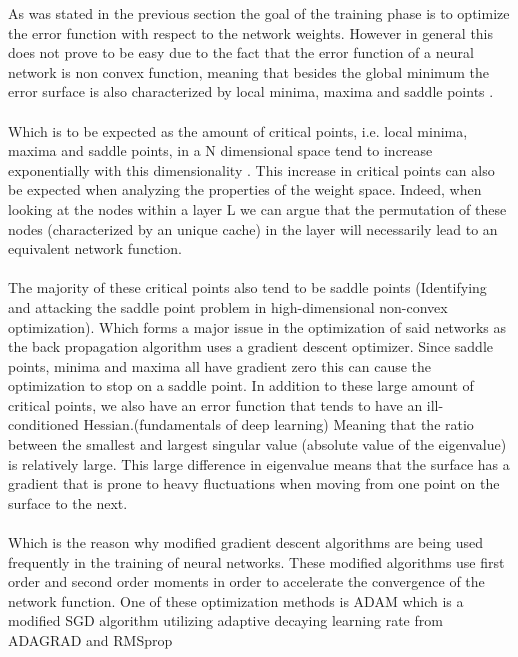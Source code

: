 \documentclass[12pt]{article}
\begin{document}
As was stated in the previous section the goal of the training phase is to optimize the error function with respect to the network weights. However in general this does not prove to be easy due to the fact that the error function of a neural network is non convex function, meaning that besides the global minimum the error surface is also characterized by local minima, maxima and saddle points \cite{Dauphin2014}.
\\
\\
Which is to be expected as the amount of critical points, i.e. local minima, maxima and saddle points, in a N dimensional space tend to increase exponentially with this dimensionality \cite{Dauphin2014}. This increase in critical points can also be expected when analyzing the properties of the weight space. Indeed, when looking at the nodes within a layer L we can argue that the permutation of these nodes (characterized by an unique cache) in the layer will necessarily lead to an equivalent network function.\cite{Bishop2013, Badrinarayanan2015} 
\\
\\
The majority of these critical points also tend to be saddle points (Identifying and attacking the saddle point problem in high-dimensional non-convex optimization). Which forms a major issue in the optimization of said networks as the back propagation algorithm uses a gradient descent optimizer. Since saddle points, minima and maxima all have gradient zero this can cause the optimization to stop on a saddle point. In addition to these large amount of critical points, we also have an error function that tends to have an ill-conditioned Hessian.(fundamentals of deep learning) Meaning that the ratio between the smallest and largest singular value (absolute value of the eigenvalue) is relatively large. This large difference in eigenvalue means that the surface has a gradient that is prone to heavy fluctuations when moving from one point on the surface to the next. \cite{Budumu} 
\\
\\ 
Which is the reason why modified gradient descent algorithms are being used frequently in the training of neural networks\cite{Xu2017}. These modified algorithms use first order and second order moments in order to accelerate the convergence of the network function. One of these optimization methods is ADAM\cite{Kingma2014} which is a modified SGD algorithm utilizing adaptive decaying learning rate from ADAGRAD and RMSprop
\\
\\
\end{document}
